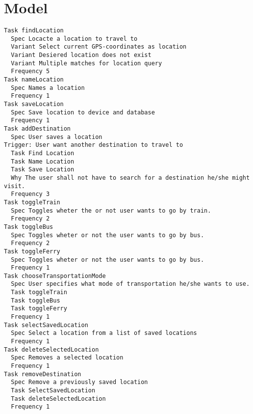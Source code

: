 \chapter{Model}


\begin{lstlisting}
Task findLocation
  Spec Locacte a location to travel to
  Variant Select current GPS-coordinates as location
  Variant Desiered location does not exist
  Variant Multiple matches for location query
  Frequency 5
Task nameLocation
  Spec Names a location
  Frequency 1
Task saveLocation
  Spec Save location to device and database
  Frequency 1
Task addDestination
  Spec User saves a location
Trigger: User want another destination to travel to
  Task Find Location
  Task Name Location
  Task Save Location
  Why The user shall not have to search for a destination he/she might visit.
  Frequency 3
Task toggleTrain
  Spec Toggles wheter the or not user wants to go by train.
  Frequency 2
Task toggleBus
  Spec Toggles wheter or not the user wants to go by bus.
  Frequency 2
Task toggleFerry
  Spec Toggles wheter or not the user wants to go by bus.
  Frequency 1
Task chooseTransportationMode
  Spec User specifies what mode of transportation he/she wants to use.
  Task toggleTrain
  Task toggleBus
  Task toggleFerry
  Frequency 1
Task selectSavedLocation
  Spec Select a location from a list of saved locations
  Frequency 1
Task deleteSelectedLocation
  Spec Removes a selected location
  Frequency 1
Task removeDestination
  Spec Remove a previously saved location
  Task SelectSavedLocation
  Task deleteSelectedLocation
  Frequency 1

\end{lstlisting}